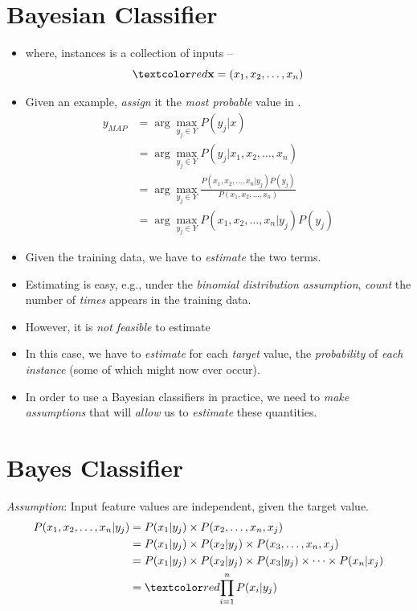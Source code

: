 \documentclass[
	number={3},
	title={Na\"iive Bayes Learning}
]{cs584notes}
\begin{document}
\section{Bayesian Classifier}\label{sec:bayesian-classifier}
\begin{itemize}
	\item {} where, instances  is a collection of inputs --
	\[ \data{ \vec{x} = (x_{1}, x_{2}, \dots, x_{n}) } \]
	\item Given an example, \emph{assign} it the \emph{most probable} value in .
	\begin{equation}[eqpurple]
	\begin{aligned}
		y_{MAP} &= \arg\max_{y_{j}\in Y} P(y_{j} | x)\\
				&= \arg\max_{y_{j}\in Y} P(y_{j} | x_{1}, x_{2}, \dots, x_{n})\\
				&= \arg\max_{y_{j}\in Y} \frac{P(x_{1}, x_{2}, \dots, x_{n}|y_{j})P(y_{j})}{P(x_{1}, x_{2}, \dots, x_{n})}\\
				&= \arg\max_{y_{j}\in Y} P(x_{1}, x_{2}, \dots, x_{n}|y_{j})P(y_{j})
	\end{aligned}
	\end{equation}
	\item Given the training data, we have to \emph{estimate} the two terms.
	\item Estimating  is easy, e.g., under the \emph{binomial distribution assumption}, \emph{count} the number of \emph{times}  appears in the training data.
	\item However, it is \emph{not feasible} to estimate 
	\item In this case, we have to \emph{estimate} for each \emph{target} value, the \emph{probability} of \emph{each instance} (some of which might now ever occur).
	\item In order to use a Bayesian classifiers in practice, we need to \emph{make assumptions} that will \emph{allow} us to \emph{estimate} these quantities.
\end{itemize}

\section{\Naive Bayes Classifier}\label{sec:naive-bayes-classifier}
\emph{Assumption}: Input feature values are independent, given the target value.
\begin{equation}[eqpurple]
\begin{aligned}
	P(x_{1}, x_{2}, \dots, x_{n} | y_{j}) &= P(x_{1} | y_{j}) \times P(x_{2}, \dots, x_{n}, x_{j})\\
										  &= P(x_{1} | y_{j}) \times P(x_{2} | y_{j}) \times P(x_{3}, \dots, x_{n}, x_{j})\\
										  &= P(x_{1} | y_{j}) \times P(x_{2} | y_{j}) \times P(x_{3} | y_{j}) \times \dots \times P(x_{n} | x_{j})\\
	&= \data{ \prod_{i=1}^{n} P(x_{i} | y_{j}) }
\end{aligned}
	\label{eq:naive-bayes-classifier-proof}
\end{equation}
\end{document}
